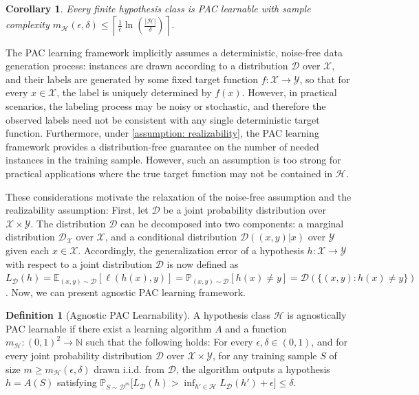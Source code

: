 \documentclass[openany, amssymb, psamsfonts]{amsart}
\newtheorem{cor}{Corollary}[section]
\theoremstyle{definition}
\newtheorem{defn}{Definition}[section]
\numberwithin{equation}{section}
\begin{document}
\begin{cor} \label{corollary: finite hypothesis class sample complexity}
Every finite hypothesis class is PAC learnable with sample complexity $m_\mathcal{H}(\epsilon, \delta) \leq \left\lceil \frac{1}{\epsilon}\ln \left(\frac{|\mathcal{H}|}{\delta}\right) \right\rceil$.
\end{cor}

The PAC learning framework implicitly assumes a deterministic, noise-free data generation process: instances are drawn according to a distribution $\mathcal{D}$ over $\mathcal{X}$, and their labels are generated by some fixed target function $f \colon \mathcal{X} \to \mathcal{Y}$, so that for every $x \in \mathcal{X}$, the label is uniquely determined by $f(x)$. However, in practical scenarios, the labeling process may be noisy or stochastic, and therefore the observed labels need not be consistent with any single deterministic target function. Furthermore, under \autoref{assumption: realizability}, the PAC learning framework provides a distribution-free guarantee on the number of needed instances in the training sample. However, such an assumption is too strong for practical applications where the true target function may not be contained in $\mathcal{H}$. 

These considerations motivate the relaxation of the noise-free assumption and the realizability assumption: First, let $\mathcal{D}$ be a joint probability distribution over $\mathcal{X} \times \mathcal{Y}$. The distribution $\mathcal{D}$ can be decomposed into two components: a marginal distribution $\mathcal{D}_{\mathcal{X}}$ over $\mathcal{X}$, and a conditional distribution $\mathcal{D}((x,y)|x)$ over $\mathcal{Y}$ given each $x \in \mathcal{X}$. Accordingly, the generalization error of a hypothesis $h \colon \mathcal{X} \to \mathcal{Y}$ with respect to a joint distribution $\mathcal{D}$ is now defined as $L_{\mathcal{D}}(h) = \mathbb{E}_{(x,y) \sim \mathcal{D}}[\ell(h(x), y)] 
= \mathbb{P}_{(x,y) \sim \mathcal{D}}[h(x) \neq y] = \mathcal{D}(\{(x,y) \colon h(x) \neq y\})$. Now, we can present agnostic PAC learning framework.

\begin{defn}[Agnostic PAC Learnability] \label{definition: agnostic PAC learnability}
A hypothesis class $\mathcal{H}$ is agnostically PAC learnable if there exist a learning algorithm $A$ and a function $m_{\mathcal{H}} : (0,1)^2 \to \mathbb{N}$ such that the following holds: For every $\epsilon, \delta \in (0,1)$, and for every joint probability distribution $\mathcal{D}$ over $\mathcal{X} \times \mathcal{Y}$, for any training sample $S$ of size $m \ge m_{\mathcal{H}}(\epsilon, \delta)$ drawn i.i.d. from $\mathcal{D}$, the algorithm outputs a hypothesis $h = A(S)$ satisfying $\mathbb{P}_{S \sim \mathcal{D}^m} \big[ L_{\mathcal{D}}(h) > \inf_{h' \in \mathcal{H}} L_{\mathcal{D}}(h') + \epsilon \big] \le \delta$.
\end{defn}
\end{document}
